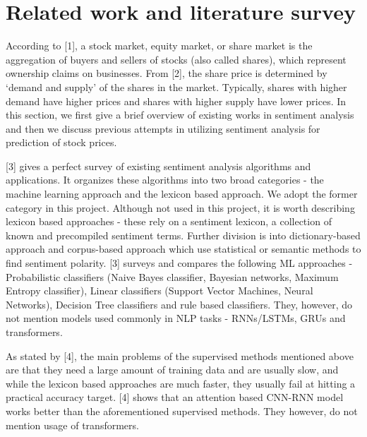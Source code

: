 \documentclass{article}
\begin{document}
\section{Related work and literature survey}
    According to [1], a stock market, equity market, or share market is the aggregation of buyers and sellers of stocks (also called shares), which represent ownership claims on businesses. From [2], the share price is determined by `demand and supply' of the shares in the market. Typically, shares with higher demand have higher prices and shares with higher supply have lower prices. In this section, we first give a brief overview of existing works in sentiment analysis and then we discuss previous attempts in utilizing sentiment analysis for prediction of stock prices. 

    [3] gives a perfect survey of existing sentiment analysis algorithms and applications. It organizes these algorithms into two broad categories - the machine learning approach and the lexicon based approach. We adopt the former category in this project. Although not used in this project, it is worth describing lexicon based approaches - these rely on a sentiment lexicon, a collection of known and precompiled sentiment terms. Further division is into dictionary-based approach and corpus-based approach which use statistical or semantic methods to find sentiment polarity. [3] surveys and compares the following ML approaches - Probabilistic classifiers (Naive Bayes classifier, Bayesian networks, Maximum Entropy classifier), Linear classifiers (Support Vector Machines, Neural Networks), Decision Tree classifiers and rule based classifiers. They, however, do not mention models used commonly in NLP tasks - RNNs/LSTMs, GRUs and transformers. 

    As stated by [4], the main problems of the supervised methods mentioned above are that they need a large amount of training data and are usually slow, and while the lexicon based approaches are much faster, they usually fail at hitting a practical accuracy target. [4] shows that an attention based CNN-RNN model works better than the aforementioned supervised methods. They however, do not mention usage of transformers.
\end{document}
